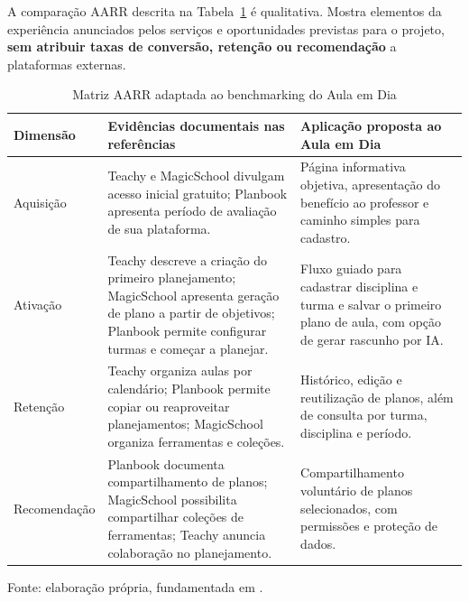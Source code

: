 A comparação AARR descrita na Tabela~\ref{tab:matriz-aarr} é qualitativa. Mostra elementos da experiência anunciados pelos serviços e oportunidades previstas para o projeto, \textbf{sem atribuir taxas de conversão, retenção ou recomendação} a plataformas externas.

\begin{table}[htbp]
\centering
\caption{Matriz AARR adaptada ao benchmarking do Aula em Dia}
\label{tab:matriz-aarr}
\scriptsize
\renewcommand{\arraystretch}{1.3}
\begin{tabularx}{\textwidth}{@{}>{\raggedright\arraybackslash}p{2cm}XX@{}}
\toprule
\textbf{Dimensão} & \textbf{Evidências documentais nas referências} & \textbf{Aplicação proposta ao Aula em Dia} \\
\midrule
Aquisição & Teachy e MagicSchool divulgam acesso inicial gratuito; Planbook apresenta período de avaliação de sua plataforma. & Página informativa objetiva, apresentação do benefício ao professor e caminho simples para cadastro. \\
Ativação & Teachy descreve a criação do primeiro planejamento; MagicSchool apresenta geração de plano a partir de objetivos; Planbook permite configurar turmas e começar a planejar. & Fluxo guiado para cadastrar disciplina e turma e salvar o primeiro plano de aula, com opção de gerar rascunho por IA. \\
Retenção & Teachy organiza aulas por calendário; Planbook permite copiar ou reaproveitar planejamentos; MagicSchool organiza ferramentas e coleções. & Histórico, edição e reutilização de planos, além de consulta por turma, disciplina e período. \\
Recomendação & Planbook documenta compartilhamento de planos; MagicSchool possibilita compartilhar coleções de ferramentas; Teachy anuncia colaboração no planejamento. & Compartilhamento voluntário de planos selecionados, com permissões e proteção de dados. \\
\bottomrule
\end{tabularx}
\par\smallskip
\begin{minipage}{\textwidth}\footnotesize Fonte: elaboração própria, fundamentada em \citet{teachy_planejamento2026,teachy_ferramentas2026,magicschool_ferramentas2026,magicschool_planos2026,planbook_professores2026}.\end{minipage}
\end{table}

